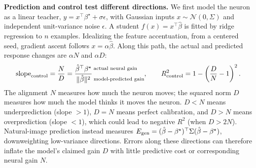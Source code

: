 \documentclass[12pt,a4paper]{article}
\newcommand{\head}[1]{\par\noindent\textbf{#1}\enspace\ignorespaces}
\newcommand{\bh}{\hat\beta}
\newcommand{\bt}{\beta^\star}
\begin{document}
\head{Prediction and control test different directions.}
We first model the neuron as a linear teacher, $y=x^\top\bt+\sigma\epsilon$, with Gaussian inputs $x\sim\mathcal N(0,\Sigma)$ and independent unit-variance noise $\epsilon$. A student $f(x)=x^\top\bh$ is fitted by ridge regression to $n$ examples. Idealizing the feature accentuation, from a centered seed, gradient ascent follows $x=\alpha\bh$. Along this path, the actual and predicted response changes are $\alpha N$ and $\alpha D$:
\begin{equation}
\mathrm{slope}_{\rm control}=\frac ND=
\frac{\bh^\top\bt}{\|\bh\|^2}\,
\begin{subarray}{l}
\text{actual neural gain}\\[8pt]
\text{model-predicted gain}
\end{subarray},
\qquad R^2_{\rm control}=1-\left(\frac DN-1\right)^2.
\label{eq:geometry}
\end{equation}
The alignment $N$ measures how much the neuron moves; the squared norm $D$ measures how much the model thinks it moves the neuron. $D<N$ means underprediction (slope $>1$), $D=N$ means perfect calibration, and $D>N$ means overprediction (slope $<1$), which could lead to negative $R^2$ (when $D>2N$). Natural-image prediction instead measures $E_{\rm gen}=(\bh-\bt)^\top\Sigma(\bh-\bt)$, downweighting low-variance directions. Errors along these directions can therefore inflate the model's claimed gain $D$ with little predictive cost or corresponding neural gain $N$.
\end{document}

